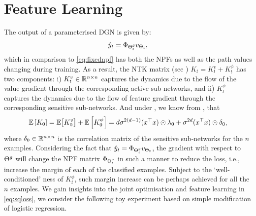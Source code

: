 \section{Feature Learning}
The output of a parameterised DGN is given by:
\begin{align}
\hat{y}_t=\Phi_{{\Theta}^g_t}v_{\Theta_t},
\end{align}
which in comparison to \eqref{eq:fixednpf} has both the NPFs as well as the path values changing during training. As a result, the NTK matrix (see ) $K_t=K^v_t+K^{\phi}_t$ has two components: i) $K^v_t\in \mathbb{R}^{n\times n}$ captures the dynamics due to the flow of the value gradient through the corresponding active sub-networks, and ii) $K^{\phi}_t$ captures the dynamics due to the flow of feature gradient through the corresponding sensitive sub-networks. And under , we know from , that 
\begin{align*}
\mathbb{E}\left[K_0\right]=\mathbb{E}\big[K^v_0\big]+\mathbb{E}\left[K^{\phi}_0\right]=d\sigma^{2(d-1)} (x^\top x)\odot \lambda_0+\sigma^{2d}  (x^\top x)\odot \delta_0,
\end{align*}
where $\delta_0\in\mathbb{R}^{n\times n}$ is the correlation matrix of the sensitive sub-networks for the $n$ examples. Considering the fact that $\hat{y}_t=\Phi_{{\Theta}^g_t}v_{\Theta_t}$, the gradient with respect to ${\Theta}^g$ will change the NPF matrix $\Phi_{{\Theta}^g_t}$ in such a manner to reduce the loss, i.e., increase the margin of each of the classified examples. Subject to the `well-conditioned' ness of $K^{\phi}_t$, such margin increase can be perhaps achieved for all the $n$ examples. 
We gain insights into the joint optimisation and feature learning in \eqref{eq:sqloss}, we consider the following toy experiment based on simple modification of logistic regression.\\

